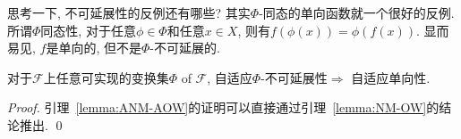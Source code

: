 \begin{note}
思考一下, 不可延展性的反例还有哪些? 其实$\Phi$-同态的单向函数就一个很好的反例. 所谓$\Phi$同态性, 对于任意$\phi \in \Phi$和任意$x \in X$, 则有$f(\phi(x)) = \phi(f(x))$. 显而易见, $f$是单向的, 但不是$\Phi$-不可延展的.
\end{note}

\begin{lemma}\label{lemma:ANM-AOW}
对于$\mathcal{F}$上任意可实现的变换集$\Phi$ of $\mathcal{F}$, 自适应$\Phi$-不可延展性$\Rightarrow$ 自适应单向性.
\end{lemma}

\begin{proof}
引理~\ref{lemma:ANM-AOW}的证明可以直接通过引理~\ref{lemma:NM-OW}的结论推出. \qed
\end{proof}

